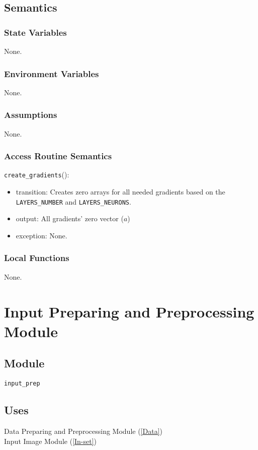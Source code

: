 \documentclass[12pt, titlepage]{article}
\def\code#1{\texttt{#1}}
\begin{document}
\subsection{Semantics}

\subsubsection{State Variables}
None.

\subsubsection{Environment Variables}
None.

\subsubsection{Assumptions}
None.

\subsubsection{Access Routine Semantics}

\noindent \code{create\_gradients}():
\begin{itemize}
  \item transition: Creates zero arrays for all needed gradients based on the 
  \code{LAYERS\_NUMBER} and \code{LAYERS\_NEURONS}.
  \item output: All gradients' zero vector ($a$)
  \item exception: None.
\end{itemize}

\subsubsection{Local Functions}
None.

\newpage

\section{Input Preparing and Preprocessing Module} \label{In-prep} 

\subsection{Module}
\code{input\_prep} 

\subsection{Uses}
Data Preparing and Preprocessing Module (\ref{Data})\\
Input Image Module (\ref{In-set}) 
\end{document}
